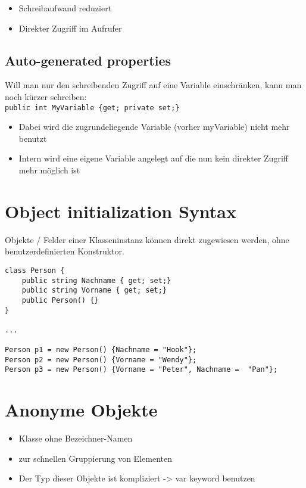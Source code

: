 \begin{itemize}
\item Schreibaufwand reduziert
\item Direkter Zugriff im Aufrufer
\end{itemize}

\subsection{Auto-generated properties}
Will man nur den schreibenden Zugriff auf eine Variable einschränken, kann man noch kürzer schreiben:\\
\lstinline$public int MyVariable {get; private set;}$
\begin{itemize}
\item Dabei wird die zugrundeliegende Variable (vorher myVariable) nicht mehr benutzt
\item Intern wird eine eigene Variable angelegt auf die nun kein direkter Zugriff mehr möglich ist
\end{itemize}

\section{Object initialization Syntax}

Objekte / Felder einer Klasseninstanz können direkt zugewiesen werden, ohne benutzerdefinierten Konstruktor.
\begin{lstlisting}[language={[Sharp]C}]
class Person { 
	public string Nachname { get; set;} 
	public string Vorname { get; set;} 
	public Person() {} 
}

...

Person p1 = new Person() {Nachname = "Hook"}; 
Person p2 = new Person() {Vorname = "Wendy"}; 
Person p3 = new Person() {Vorname = "Peter", Nachname =  "Pan"};
\end{lstlisting}

\section{Anonyme Objekte}

\begin{itemize}
\item Klasse ohne Bezeichner-Namen
\item zur schnellen Gruppierung von Elementen 
\item Der Typ dieser Objekte ist kompliziert -{\textgreater} var keyword benutzen
\end{itemize}